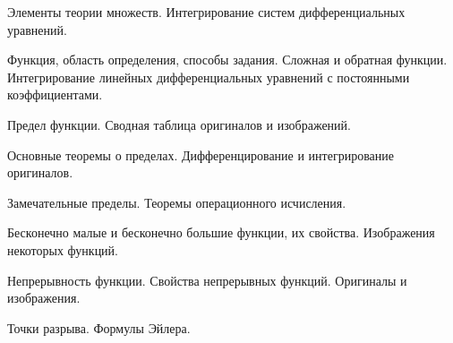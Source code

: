 \documentclass[
	14pt,
	a4paper,
	]
	{scrartcl}
\begin{document}
\shapk
{}
\setcounter{zad}{0}

\vfill
\z Элементы теории множеств.
 \vfill
\z Интегрирование систем дифференциальных уравнений. \vfill

\vfill

\newpage


\shapk
{}
\setcounter{zad}{0}

\vfill
\z Функция, область определения, способы задания. Сложная и обратная функции.
 \vfill
\z Интегрирование линейных дифференциальных уравнений с постоянными коэффициентами.
 \vfill

\vfill

\newpage


\shapk
{}
\setcounter{zad}{0}

\vfill
\z Предел функции.
 \vfill
\z Сводная таблица оригиналов и изображений.
 \vfill

\vfill

\newpage


\shapk
{}
\setcounter{zad}{0}

\vfill
\z Основные теоремы о пределах.
 \vfill
\z Дифференцирование и интегрирование оригиналов.
 \vfill

\vfill

\newpage


\shapk
{}
\setcounter{zad}{0}

\vfill
\z Замечательные пределы.
 \vfill
\z Теоремы операционного исчисления.
 \vfill

\vfill

\newpage


\shapk
{}
\setcounter{zad}{0}

\vfill
\z Бесконечно малые и бесконечно большие функции, их свойства.
 \vfill
\z Изображения некоторых функций.
 \vfill

\vfill

\newpage


\shapk
{}
\setcounter{zad}{0}

\vfill
\z Непрерывность функции. Свойства непрерывных функций.
 \vfill
\z Оригиналы и изображения.
 \vfill

\vfill

\newpage


\shapk
{}
\setcounter{zad}{0}

\vfill
\z Точки разрыва.
 \vfill
\z Формулы Эйлера.
 \vfill
\end{document}
